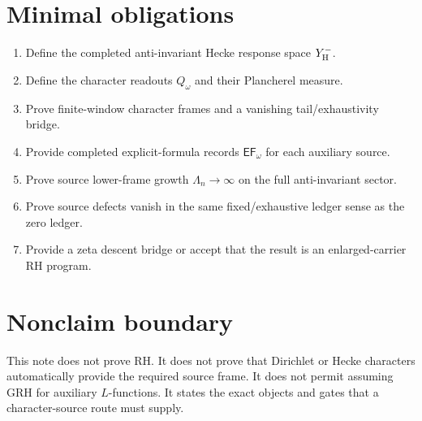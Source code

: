 \documentclass[11pt]{article}
\begin{document}
\section{Minimal obligations}
\begin{enumerate}[label=H\arabic*.]
\item Define the completed anti-invariant Hecke response space \(Y^-_{\rm H}\).
\item Define the character readouts \(Q_\omega\) and their Plancherel measure.
\item Prove finite-window character frames and a vanishing tail/exhaustivity bridge.
\item Provide completed explicit-formula records \(\mathsf{EF}_\omega\) for each auxiliary source.
\item Prove source lower-frame growth \(\Lambda_n\to\infty\) on the full anti-invariant sector.
\item Prove source defects vanish in the same fixed/exhaustive ledger sense as the zero ledger.
\item Provide a zeta descent bridge or accept that the result is an enlarged-carrier RH program.
\end{enumerate}

\section{Nonclaim boundary}
This note does not prove RH.  It does not prove that Dirichlet or Hecke characters automatically provide the required source frame.  It does not permit assuming GRH for auxiliary \(L\)-functions.  It states the exact objects and gates that a character-source route must supply.
\end{document}
